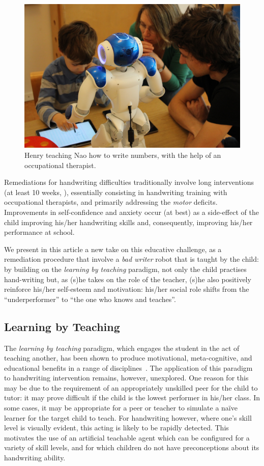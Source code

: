 \documentclass{article}
\begin{document}
\begin{figure}
    \centering
    \includegraphics[width=0.9\linewidth]{henry}
    \caption{\small Henry teaching Nao how to write numbers, with the help of an
    occupational therapist.}
    \label{fig:henry}
\end{figure}

Remediations for handwriting difficulties traditionally involve long
interventions (at least 10 weeks, \cite{Hoy2011}), essentially consisting in
handwriting training with occupational therapists, and primarily addressing the
\emph{motor} deficits.  Improvements in self-confidence and anxiety occur (at
best) as a side-effect of the child improving his/her handwriting skills and,
consequently, improving his/her performance at school.

We present in this article a new take on this educative challenge, as a
remediation procedure that involve a \emph{bad writer} robot that is taught by the
child: by building on the \emph{learning by teaching} paradigm, not only the
child practises hand-writing but, as (s)he takes on the role of the teacher,
(s)he also positively reinforce his/her self-esteem and motivation: his/her
social role shifts from the ``underperformer'' to ``the one who knows and teaches''.

\subsection{Learning by Teaching}

The \emph{learning by teaching} paradigm, which engages the student in the act
of teaching another, has been shown to produce motivational, meta-cognitive, and
educational benefits in a range of disciplines~\cite{Rohrbeck2003}.  The
application of this paradigm to handwriting intervention remains, however,
unexplored. One reason for this may be due to the requirement of an
appropriately unskilled peer for the child to tutor: it may prove difficult if
the child is the lowest performer in his/her class.  In some cases, it may be
appropriate for a peer or teacher to simulate a na\"ive learner for the target
child to teach. For handwriting however, where one's skill level is visually
evident, this acting is likely to be rapidly detected. This motivates the use of
an artificial teachable agent which can be configured for a variety of skill
levels, and for which children do not have preconceptions about its handwriting
ability.
\end{document}
